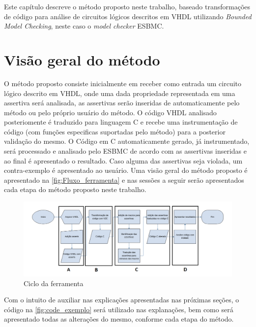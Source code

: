 \label{chapter:metodo}
\par
Este capítulo descreve o método proposto neste trabalho, baseado transformações de código para análise de circuitos lógicos descritos em VHDL utilizando 
\textit{Bounded Model Checking}, neste caso o \textit{model checker} ESBMC.

\section{Visão geral do método}

\par
O método proposto consiste inicialmente em receber como entrada um circuito lógico descrito em VHDL, onde uma dada propriedade representada em uma assertiva será analisada, as assertivas serão inseridas de automaticamente pelo método ou pelo próprio usuário do método. O código VHDL analisado posteriomente é traduzido para linguagem C e recebe uma instrumentação de código (com funções especificas suportadas pelo método) para a posterior validação do mesmo. O Código em C automaticamente gerado, já instrumentado, será processado e analisado pelo ESBMC de acordo com as assertivas inseridas e ao final é apresentado o resultado. Caso alguma das assertivas seja violada, um contra-exemplo é apresentado ao usuário. Uma visão geral do método proposto é apresentado na \autoref{fig:Fluxo_ferramenta} e nas sessões a seguir serão apresentados cada etapa do método proposto neste trabalho.

\begin{figure}[H]
	\begin{center}
    \caption{\label{fig:Fluxo_ferramenta}Ciclo da ferramenta}
	\includegraphics[scale=0.55]{Figuras/Fluxo_ferramenta.png}
	\end{center}
\end{figure}

\par
Com o intuito de auxiliar nas explicações apresentadas nas próximas seções, o código na \autoref{fig:code_exemplo} será utilizado nas explanações, bem como será apresentado todas as alterações do mesmo, conforme cada etapa do método.  

